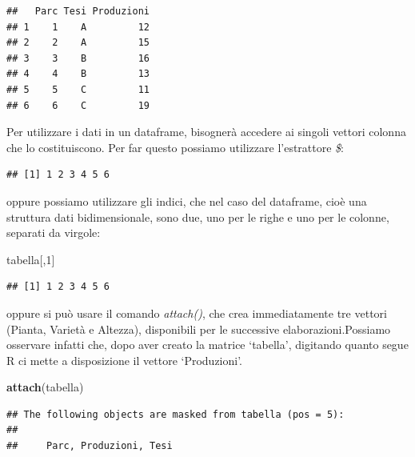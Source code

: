 \documentclass[a4paper,12pt,oneside]{book}
\newenvironment{Shaded}{\begin{snugshade}}{\end{snugshade}}
\newcommand{\KeywordTok}[1]{\textcolor[rgb]{0.13,0.29,0.53}{\textbf{#1}}}
\newcommand{\DecValTok}[1]{\textcolor[rgb]{0.00,0.00,0.81}{#1}}
\newcommand{\OperatorTok}[1]{\textcolor[rgb]{0.81,0.36,0.00}{\textbf{#1}}}
\newcommand{\NormalTok}[1]{#1}
\begin{document}
\begin{verbatim}
##   Parc Tesi Produzioni
## 1    1    A         12
## 2    2    A         15
## 3    3    B         16
## 4    4    B         13
## 5    5    C         11
## 6    6    C         19
\end{verbatim}

Per utilizzare i dati in un dataframe, bisognerà accedere ai singoli
vettori colonna che lo costituiscono. Per far questo possiamo utilizzare
l'estrattore \emph{\$}:

\begin{Shaded}
\end{Shaded}

\begin{verbatim}
## [1] 1 2 3 4 5 6
\end{verbatim}

oppure possiamo utilizzare gli indici, che nel caso del dataframe, cioè
una struttura dati bidimensionale, sono due, uno per le righe e uno per
le colonne, separati da virgole:

\begin{Shaded}
\begin{Highlighting}[]
\NormalTok{tabella[,}\DecValTok{1}\NormalTok{]}
\end{Highlighting}
\end{Shaded}

\begin{verbatim}
## [1] 1 2 3 4 5 6
\end{verbatim}

oppure si può usare il comando \emph{attach()}, che crea immediatamente
tre vettori (Pianta, Varietà e Altezza), disponibili per le successive
elaborazioni.Possiamo osservare infatti che, dopo aver creato la matrice
`tabella', digitando quanto segue R ci mette a disposizione il vettore
`Produzioni'.

\begin{Shaded}
\begin{Highlighting}[]
\KeywordTok{attach}\NormalTok{(tabella)}
\end{Highlighting}
\end{Shaded}

\begin{verbatim}
## The following objects are masked from tabella (pos = 5):
## 
##     Parc, Produzioni, Tesi
\end{verbatim}
\end{document}
